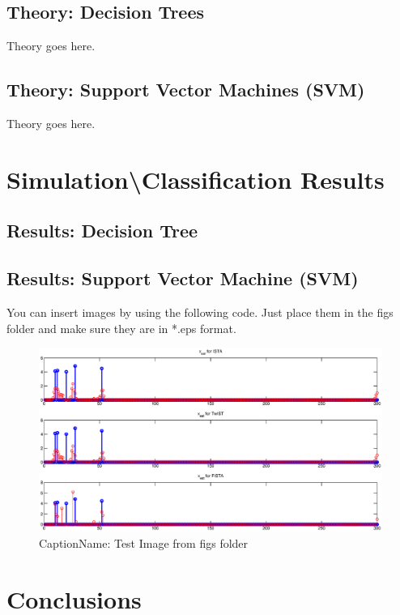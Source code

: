 \documentclass{article}
\begin{document}
\subsection{Theory: Decision Trees}
\label{sub:theoryDecisionTrees}
Theory goes here.

\subsection{Theory: Support Vector Machines (SVM)}
\label{sub:theorySVM}
Theory goes here.

\section[Results]{Simulation\textbackslash Classification Results}
\label{sec:Results}

\subsection{Results: Decision Tree}
\label{sub:resultsTrees}

\subsection{Results: Support Vector Machine (SVM)}
\label{sub:resultsSVM}
You can insert images by using the following code.  Just place them in the figs folder and make sure they are in *.eps format.\cite{bishop:2006}
%
\begin{figure}[H]
	{\centering
		\includegraphics[trim = 10mm 10mm 10mm 0mm, clip,width=1.0\textwidth]{figs/Test_Image}
		\caption{CaptionName: Test Image from figs folder}
		\label{fig:Test}
	}
\end{figure}

\section{Conclusions}
\label{sec:Conclusions}

\nocite{*}  %

 
\end{document}

